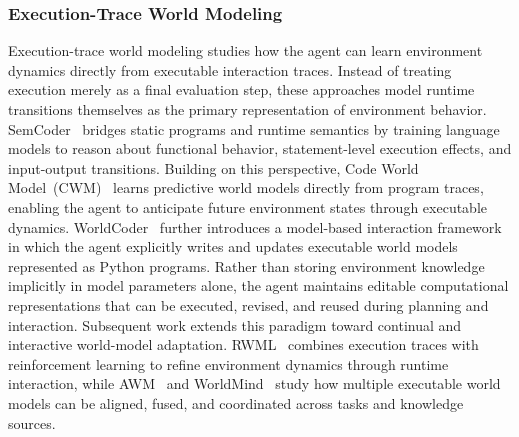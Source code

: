 \subsubsection{Execution-Trace World Modeling}
Execution-trace world modeling studies how the agent can learn
environment dynamics directly from executable interaction traces.
Instead of treating execution merely as a final evaluation step,
these approaches model runtime transitions themselves as the
primary representation of environment behavior.
SemCoder~\cite{ding2024semcoder} bridges static programs and
runtime semantics by training language models to reason about
functional behavior, statement-level execution effects, and
input-output transitions.
Building on this perspective, Code World
Model~(CWM)~\cite{copet2025cwm} learns predictive world models
directly from program traces, enabling the agent to anticipate
future environment states through executable dynamics.
WorldCoder~\cite{tang2024worldcoder} further introduces a
model-based interaction framework in which the agent explicitly
writes and updates executable world models represented as Python
programs.
Rather than storing environment knowledge implicitly in model
parameters alone, the agent maintains editable computational
representations that can be executed, revised, and reused during
planning and interaction.
Subsequent work extends this paradigm toward continual and
interactive world-model adaptation.
RWML~\cite{yu2026reinforcement} combines execution traces with
reinforcement learning to refine environment dynamics through
runtime interaction, while
AWM~\cite{wang2026agent} and
WorldMind~\cite{ren2026aligning} study how multiple executable
world models can be aligned, fused, and coordinated across tasks
and knowledge sources.

